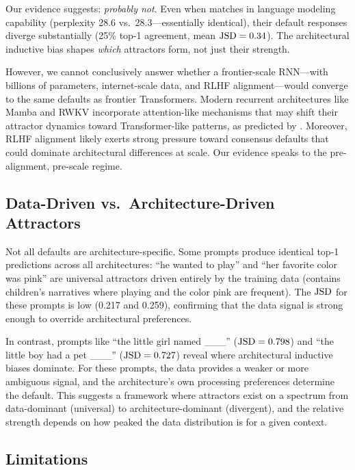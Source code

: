 Our evidence suggests: \emph{probably not}. Even when \gru matches \transformer in language modeling capability (perplexity 28.6 vs.\ 28.3---essentially identical), their default responses diverge substantially (25\% top-1 agreement, mean $\mathrm{JSD} = 0.34$). The architectural inductive bias shapes \emph{which} attractors form, not just their strength.

However, we cannot conclusively answer whether a frontier-scale RNN---with billions of parameters, internet-scale data, and RLHF alignment---would converge to the same defaults as frontier Transformers. Modern recurrent architectures like Mamba \citep{gu2023mamba} and RWKV \citep{peng2023rwkv} incorporate attention-like mechanisms that may shift their attractor dynamics toward Transformer-like patterns, as predicted by \citet{wen2024rnns}. Moreover, RLHF alignment likely exerts strong pressure toward consensus defaults that could dominate architectural differences at scale. Our evidence speaks to the pre-alignment, pre-scale regime.

\subsection{Data-Driven vs.\ Architecture-Driven Attractors}

Not all defaults are architecture-specific. Some prompts produce identical top-1 predictions across all architectures: ``he wanted to play'' and ``her favorite color was pink'' are universal attractors driven entirely by the training data (\tinystories contains children's narratives where playing and the color pink are frequent). The $\mathrm{JSD}$ for these prompts is low (0.217 and 0.259), confirming that the data signal is strong enough to override architectural preferences.

In contrast, prompts like ``the little girl named \_\_\_'' ($\mathrm{JSD} = 0.798$) and ``the little boy had a pet \_\_\_'' ($\mathrm{JSD} = 0.727$) reveal where architectural inductive biases dominate. For these prompts, the data provides a weaker or more ambiguous signal, and the architecture's own processing preferences determine the default. This suggests a framework where attractors exist on a spectrum from data-dominant (universal) to architecture-dominant (divergent), and the relative strength depends on how peaked the data distribution is for a given context.

\subsection{Limitations}
\label{sec:limitations}

